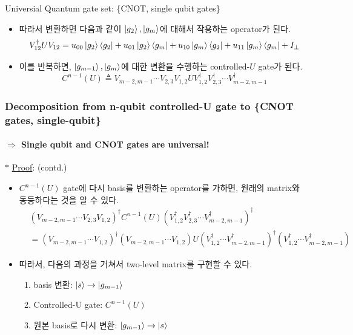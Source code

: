 \documentclass[9pt]{beamer}
\begin{document}
\begin{section}{Universial Quantum gate set: \{CNOT, single qubit gates\}}
\begin{frame}
\begin{itemize}
                    \item 따라서 변환하면 다음과 같이 $\ket{g_2}, \ket{g_m}$에 대해서 작용하는 operator가 된다.
                    $$V_{12}^\dagger UV_{12} = u_{00} \ket{g_2}\bra{g_2} + u_{01}\ket{g_2}\bra{g_m} +u_{10} \ket{g_m}\bra{g_2}+ u_{11} \ket{g_m}\bra{g_m} + I_{\perp} $$
                    \item 이를 반복하면, $\ket{g_{m-1}}, \ket{g_m}$에 대한 변환을 수행하는 controlled-$U$ gate가 된다.
                    $$C^{n-1}(U) \triangleq V_{m-2,{m-1}} \cdots  V_{2,3} V_{1,2} U V^\dagger_{1,2} V^\dagger_{2,3} \cdots V^\dagger_{m-2,{m-1}} $$
                \end{itemize}
        \end{frame}

        \begin{frame}
            \frametitle{Decomposition from n-qubit controlled-U gate to \{CNOT gates, single-qubit\}}
            \framesubtitle{$\Rightarrow$ Single qubit and CNOT gates are universal!}
                $\ast$ \underline{Proof}: (contd.)
                \begin{itemize}
                    \item $C^{n-1}(U)$ gate에 다시 basis를 변환하는 operator를 가하면, 원래의 matrix와 동등하다는 것을 알 수 있다.
                    $$ \begin{aligned} &(V_{m-2,{m-1}} \cdots  V_{2,3} V_{1,2})^\dagger C^{n-1}(U) (V^\dagger_{1,2} V^\dagger_{2,3} \cdots V^\dagger_{m-2,{m-1}})^\dagger \\
                        &= (V_{m-2,{m-1}} \cdots V_{1,2})^\dagger (V_{m-2,{m-1}} \cdots V_{1,2}) U  (V^\dagger_{1,2} \cdots V^\dagger_{m-2,{m-1}})^\dagger (V^\dagger_{1,2} \cdots V^\dagger_{m-2,{m-1}} )\end{aligned}$$
                    \item 따라서, 다음의 과정을 거쳐서 two-level matrix를 구현할 수 있다.
                    \begin{enumerate}
                        \item basis 변환: $\ket{s} \rightarrow \ket{g_{m-1}}$
                        \item Controlled-U gate: $C^{n-1}(U)$
                        \item 원본 basis로 다시 변환: $\ket{g_{m-1}} \rightarrow \ket{s}$
                    \end{enumerate}
                    \vspace{-0.2cm}
                    \begin{table}[h]

\end{table}
\end{itemize}
\end{frame}
\end{section}
\end{document}
